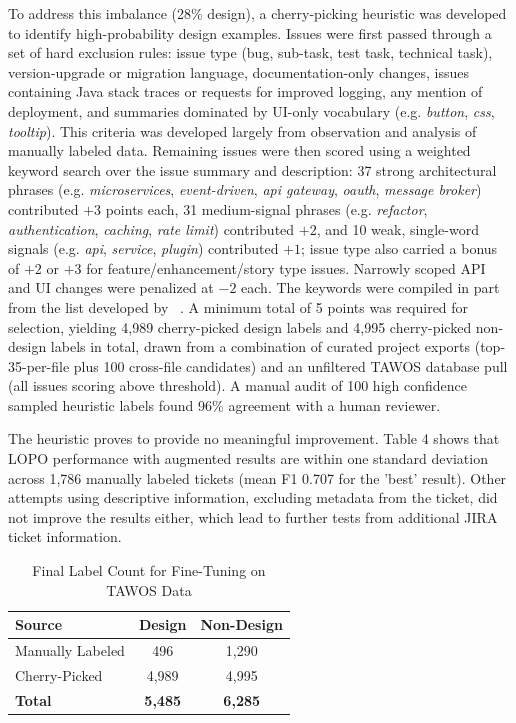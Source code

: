 \documentclass[preprint,12pt]{elsarticle}
\begin{document}
To address this imbalance (28\% design), a cherry-picking heuristic was developed to identify high-probability design examples. Issues were first passed through a set of hard exclusion rules: issue type (bug, sub-task, test task, technical task), version-upgrade or migration language, documentation-only changes, issues containing Java stack traces or requests for improved logging, any mention of deployment, and summaries dominated by UI-only vocabulary (e.g. \emph{button}, \emph{css}, \emph{tooltip}). This criteria was developed largely from observation and analysis of manually labeled data. Remaining issues were then scored using a weighted keyword search over the issue summary and description: 37 strong architectural phrases (e.g. \emph{microservices}, \emph{event-driven}, \emph{api gateway}, \emph{oauth}, \emph{message broker}) contributed $+3$ points each, 31 medium-signal phrases (e.g. \emph{refactor}, \emph{authentication}, \emph{caching}, \emph{rate limit}) contributed $+2$, and 10 weak, single-word signals (e.g. \emph{api}, \emph{service}, \emph{plugin}) contributed $+1$; issue type also carried a bonus of $+2$ or $+3$ for feature/enhancement/story type issues. Narrowly scoped API and UI changes were penalized at $-2$ each. The keywords were compiled in part from the list developed by ~\cite{mahadi2021}. A minimum total of 5 points was required for selection, yielding 4,989 cherry-picked design labels and 4,995 cherry-picked non-design labels in total, drawn from a combination of curated project exports (top-35-per-file plus 100 cross-file candidates) and an unfiltered TAWOS database pull (all issues scoring above threshold). A manual audit of 100 high confidence sampled heuristic labels found 96\% agreement with a human reviewer.

The heuristic proves to provide no meaningful improvement. Table 4 shows that LOPO performance with augmented results are within one standard deviation across 1,786 manually labeled tickets (mean F1 0.707 for the 'best' result). Other attempts using descriptive information, excluding metadata from the ticket, did not improve the results either, which lead to further tests from additional JIRA ticket information.

\begin{table}[t]
\centering
\label{tab:labels}
\begin{tabular}{lcc}
\toprule
\textbf{Source} & \textbf{Design} & \textbf{Non-Design} \\
\midrule
Manually Labeled & 496 & 1,290 \\
Cherry-Picked & 4,989 & 4,995 \\
\midrule
\textbf{Total} & \textbf{5,485} & \textbf{6,285} \\
\bottomrule
\end{tabular}
\caption{Final Label Count for Fine-Tuning on TAWOS Data}
\end{table}
\end{document}
